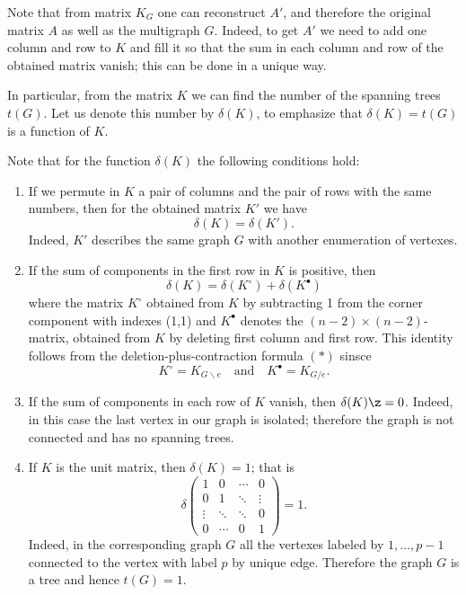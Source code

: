 Note that from matrix $K_G$ one can reconstruct $A'$, and therefore the original matrix $A$ as well as the multigraph $G$.
Indeed, to get $A'$ we need to add one column and row to $K$ and fill it so that the sum in each column and row of the obtained matrix vanish;
this can be done in a unique way.

In particular, from the matrix $K$ we can find the number of the spanning trees $t(G)$.
Let us denote this number by $\delta(K)$, to emphasize that $\delta(K)=t(G)$ is a function of $K$.

Note that for the function $\delta(K)$ the following conditions hold:
\begin{enumerate}
\item\label{delata-1} If we permute in $K$ a pair of columns and the pair of rows with the same numbers, then for the obtained matrix $K'$ we have 
\[\delta(K)=\delta(K').\]
Indeed, $K'$ describes the same graph $G$ with another enumeration of vertexes.

\item \label{delata-2}
If the sum of components in the first row in $K$ is positive, then
\[\delta(K)=\delta(K^{\circ})+\delta(K^{\bullet})\]
where the matrix $K^{\circ}$ obtained from $K$ by subtracting 1 from the corner component with indexes (1,1) and $K^{\bullet}$ denotes the $(n-2)\times(n-2)$-matrix, obtained from $K$ by deleting first column and first row.
This identity follows from the deletion-plus-contraction formula $({*})$ sinsce \[K^{\circ}=K_{G\backslash e}\quad\text{and}\quad K^{\bullet}=K_{G/e}.\]

\item\label{delata-3} If the sum of components in each row of $K$ vanish, then $\delta(K)\z=0$. 
Indeed, in this case the last vertex in our graph is isolated;
therefore the graph is not connected and has no spanning trees.

\item\label{delata-4} If $K$ is the unit matrix, then $\delta(K)=1$;
that is
\[
\delta\left(
\begin{matrix}
1&0&\cdots&0
\\
0&1&\ddots&\vdots
\\
\vdots&\ddots&\ddots&0
\\
0&\cdots&0&1
\end{matrix}
\right)=1.
\]
Indeed, in the corresponding graph $G$ all the vertexes labeled by $1,\dots,p-1$ connected to the vertex with label $p$ by unique edge. 
Therefore the graph $G$ is a tree and hence $t(G)=1$.
\end{enumerate}

